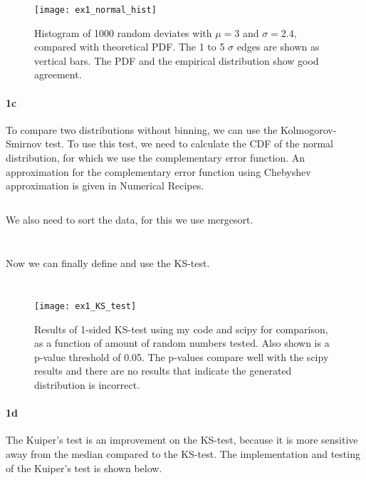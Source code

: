 \inputminted[firstline=195, lastline=211]{Python}{../NUR_random.py}
\inputminted[firstline=36, lastline=60]{Python}{../ex1.py}

\begin{figure}[ht]
  \centering
  \texttt{[image: ex1\_normal\_hist]}
  \caption{Histogram of 1000 random deviates with $\mu = 3$ and $\sigma = 2.4$, compared with theoretical PDF\@.
  The 1 to 5 $\sigma$ edges are shown as vertical bars.
  The PDF and the empirical distribution show good agreement.}\label{fig:ex1_normal_hist}
\end{figure}

\paragraph{1c}
To compare two distributions without binning, we can use the Kolmogorov-Smirnov test.
To use this test, we need to calculate the CDF of the normal distribution, for which we use the complementary error function.
An approximation for the complementary error function using Chebyshev approximation is given in Numerical Recipes.

\inputminted[firstline=4, lastline=47]{Python}{../NUR_random.py}

We also need to sort the data, for this we use mergesort.

\inputminted[firstline=3, lastline=15]{Python}{../sorting.py}
\inputminted[firstline=62, lastline=95]{Python}{../sorting.py}

Now we can finally define and use the KS-test.

\inputminted[firstline=49, lastline=75]{Python}{../NUR_random.py}
\inputminted[firstline=62, lastline=81]{Python}{../ex1.py}

\begin{figure}[ht]
  \centering
  \texttt{[image: ex1\_KS\_test]}
  \caption{Results of 1-sided KS-test using my code and scipy for comparison, as a function of amount of random numbers tested.
  Also shown is a p-value threshold of 0.05.
  The p-values compare well with the scipy results and there are no results that indicate the generated distribution is incorrect.}\label{fig:ex1_KS_test}
\end{figure}

\paragraph{1d}
The Kuiper's test is an improvement on the KS-test, because it is more sensitive away from the median compared to the KS-test.
The implementation and testing of the Kuiper's test is shown below.

